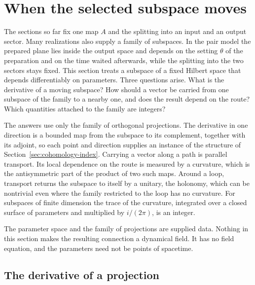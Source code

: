 \section{When the selected subspace moves}
\label{sec:moving-subspace}

The sections so far fix one map $A$ and the splitting into an input and an output sector. Many realizations also supply a family of subspaces. In the pair model the prepared plane lies inside the output space and depends on the setting $\theta$ of the preparation and on the time waited afterwards, while the splitting into the two sectors stays fixed. This section treats a subspace of a fixed Hilbert space that depends differentiably on parameters. Three questions arise. What is the derivative of a moving subspace? How should a vector be carried from one subspace of the family to a nearby one, and does the result depend on the route? Which quantities attached to the family are integers?

The answers use only the family of orthogonal projections. The derivative in one direction is a bounded map from the subspace to its complement, together with its adjoint, so each point and direction supplies an instance of the structure of Section~\ref{sec:cohomology-index}. Carrying a vector along a path is parallel transport. Its local dependence on the route is measured by a curvature, which is the antisymmetric part of the product of two such maps. Around a loop, transport returns the subspace to itself by a unitary, the holonomy, which can be nontrivial even where the family restricted to the loop has no curvature. For subspaces of finite dimension the trace of the curvature, integrated over a closed surface of parameters and multiplied by $i/(2\pi)$, is an integer.

The parameter space and the family of projections are supplied data. Nothing in this section makes the resulting connection a dynamical field. It has no field equation, and the parameters need not be points of spacetime.

\subsection{The derivative of a projection}
\label{subsec:moving-derivative}

